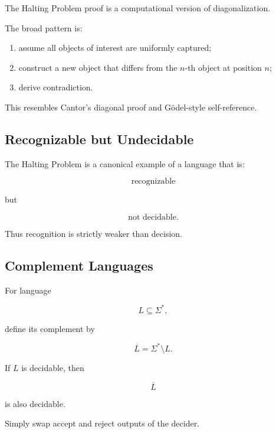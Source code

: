 The Halting Problem proof is a computational version of diagonalization.

The broad pattern is:

\begin{enumerate}
    \item assume all objects of interest are uniformly captured;
    \item construct a new object that differs from the \(n\)-th object at
          position \(n\);
    \item derive contradiction.
\end{enumerate}

This resembles Cantor's diagonal proof and Gödel-style self-reference.

\subsection{Recognizable but Undecidable}
\label{subsec:recognizable-undecidable}

The Halting Problem is a canonical example of a language that is:

\[
\boxed{
\text{recognizable}
}
\]

but

\[
\boxed{
\text{not decidable}.
}
\]

Thus recognition is strictly weaker than decision.

\subsection{Complement Languages}
\label{subsec:complement-languages-computability}

For language

\[
L\subseteq\Sigma^*,
\]

define its complement by

\[
\boxed{
\overline{L}
=
\Sigma^*\setminus L.
}
\]

If \(L\) is decidable, then

\[
\boxed{
\overline{L}
}
\]

is also decidable.

Simply swap accept and reject outputs of the decider.

